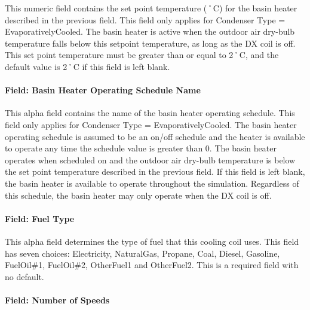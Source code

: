 This numeric field contains the set point temperature (˚C) for the basin heater described in the previous field. This field only applies for Condenser Type = EvaporativelyCooled. The basin heater is active when the outdoor air dry-bulb temperature falls below this setpoint temperature, as long as the DX coil is off. This set point temperature must be greater than or equal to 2˚C, and the default value is 2˚C if this field is left blank.

\paragraph{Field: Basin Heater Operating Schedule Name}\label{field-basin-heater-operating-schedule-name-3-000}

This alpha field contains the name of the basin heater operating schedule. This field only applies for Condenser Type = EvaporativelyCooled. The basin heater operating schedule is assumed to be an on/off schedule and the heater is available to operate any time the schedule value is greater than 0. The basin heater operates when scheduled on and the outdoor air dry-bulb temperature is below the set point temperature described in the previous field. If this field is left blank, the basin heater is available to operate throughout the simulation. Regardless of this schedule, the basin heater may only operate when the DX coil is off.

\paragraph{Field: Fuel Type}\label{field-fuel-type-000}

This alpha field determines the type of fuel that this cooling coil uses. This field has seven choices: Electricity, NaturalGas, Propane, Coal, Diesel, Gasoline, FuelOil\#1, FuelOil\#2, OtherFuel1 and OtherFuel2. This is a required field with no default.

\paragraph{Field: Number of Speeds}\label{field-number-of-speeds}

